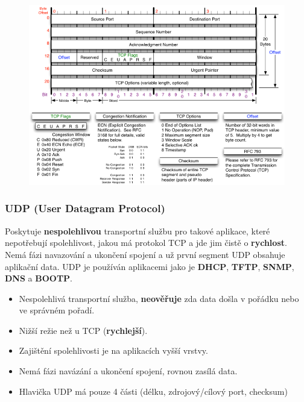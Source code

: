 \begin{figure}[H]
	\centering
	\includegraphics[width=\textwidth]{assets/4_tcp}
\end{figure}

\subsubsection{UDP (User Datagram Protocol)}
Poskytuje \textbf{nespolehlivou} transportní službu pro takové aplikace, které nepotřebují spolehlivost, jakou má protokol TCP a jde jim čistě o \textbf{rychlost}. Nemá fázi navazování a ukončení spojení a už první segment UDP obsahuje aplikační data. UDP je používán aplikacemi jako je \textbf{DHCP}, \textbf{TFTP}, \textbf{SNMP}, \textbf{DNS} a \textbf{BOOTP}.
\begin{itemize}
	\item Nespolehlivá transportní služba, \textbf{neověřuje} zda data došla v pořádku nebo ve správném pořadí.
	\item Nižší režie než u TCP (\textbf{rychlejší}).
	\item Zajištění spolehlivosti je na aplikacích vyšší vrstvy.
	\item Nemá fázi navázání a ukončení spojení, rovnou zasílá data.
	\item Hlavička UDP má pouze 4 části (délku, zdrojový/cílový port, checksum)
\end{itemize}

\noindent{}

